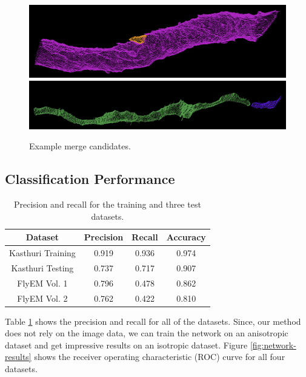 \begin{figure}[t!]
	\centering
	\includegraphics[width=0.85\linewidth]{./figures/merge_candidate1.png}
	\includegraphics[width=0.85\linewidth]{./figures/merge_candidate2.png}
	\caption{Example merge candidates.}
	\label{fig:skeleton-results}
\end{figure}


\subsection{Classification Performance}

\begin{table}
	\centering
	\begin{tabular}{c c c c} \hline
	\textbf{Dataset} & \textbf{Precision} & \textbf{Recall} & \textbf{Accuracy} \\ \hline
	Kasthuri Training & 0.919 & 0.936 & 0.974 \\
	Kasthuri Testing & 0.737 & 0.717 & 0.907 \\
	FlyEM Vol. 1 & 0.796 & 0.478 & 0.862 \\ 
	FlyEM Vol. 2 & 0.762 & 0.422 & 0.810 \\ \hline
	\end{tabular}
	\caption{Precision and recall for the training and three test datasets.}
	\label{table:classification}
\end{table}

Table \ref{table:classification} shows the precision and recall for all of the datasets. 
Since, our method does not rely on the image data, we can train the network on an anisotropic dataset and get impressive results on an isotropic dataset. 
Figure \ref{fig:network-results} shows the receiver operating characteristic (ROC) curve for all four datasets. 

